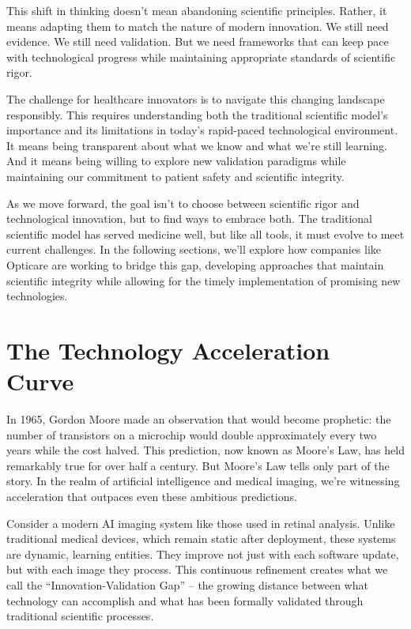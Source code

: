 \documentclass[
  Letterpaper,
]{scrbook}
\begin{document}
This shift in thinking doesn't mean abandoning scientific principles.
Rather, it means adapting them to match the nature of modern innovation.
We still need evidence. We still need validation. But we need frameworks
that can keep pace with technological progress while maintaining
appropriate standards of scientific rigor.

The challenge for healthcare innovators is to navigate this changing
landscape responsibly. This requires understanding both the traditional
scientific model's importance and its limitations in today's rapid-paced
technological environment. It means being transparent about what we know
and what we're still learning. And it means being willing to explore new
validation paradigms while maintaining our commitment to patient safety
and scientific integrity.

As we move forward, the goal isn't to choose between scientific rigor
and technological innovation, but to find ways to embrace both. The
traditional scientific model has served medicine well, but like all
tools, it must evolve to meet current challenges. In the following
sections, we'll explore how companies like Opticare are working to
bridge this gap, developing approaches that maintain scientific
integrity while allowing for the timely implementation of promising new
technologies.

\section{The Technology Acceleration
Curve}\label{the-technology-acceleration-curve}

In 1965, Gordon Moore made an observation that would become prophetic:
the number of transistors on a microchip would double approximately
every two years while the cost halved. This prediction, now known as
Moore's Law, has held remarkably true for over half a century. But
Moore's Law tells only part of the story. In the realm of artificial
intelligence and medical imaging, we're witnessing acceleration that
outpaces even these ambitious predictions.

Consider a modern AI imaging system like those used in retinal analysis.
Unlike traditional medical devices, which remain static after
deployment, these systems are dynamic, learning entities. They improve
not just with each software update, but with each image they process.
This continuous refinement creates what we call the
``Innovation-Validation Gap'' -- the growing distance between what
technology can accomplish and what has been formally validated through
traditional scientific processes.
\end{document}
